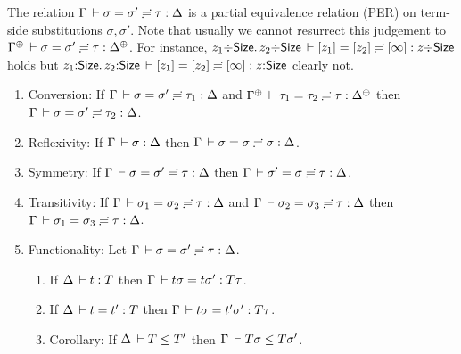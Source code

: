 \documentclass[acmsmall%
]{acmart}\settopmatter{printfolios=true}
\newcommand{\LONGVERSION}[1]{}
\begin{document}
The relation $\Gamma \,\vdash \sigma = \sigma' \risingdotseq \tau : \Delta$ is a partial equivalence
relation (PER) on term-side substitutions $\sigma,\sigma'$. Note that
usually we cannot resurrect this judgement to
$\sueq{\resurrect\Gamma}{\sigma}{\sigma'}\tau {\resurrect\Delta}$.
For instance,
$z_1 {\div} \mathsf{Size}.\,z_2 {\div} \mathsf{Size} \,\vdash [z_1] = [z_2] \risingdotseq [\infty] : z {\div} \mathsf{Size}$
holds but
$z_1 {:} \mathsf{Size}.\,z_2 {:} \mathsf{Size} \,\vdash [z_1] = [z_2] \risingdotseq [\infty] : z {:} \mathsf{Size}$
clearly not.
\begin{lemma}
\label{lem:subeq}\bla
\begin{enumerate}
\item Conversion: If\/ $\Gamma \,\vdash \sigma = \sigma' \risingdotseq \tau_1 : \Delta$ and $\sueq {\resurrect\Gamma} {\tau_1} {\tau_2} {\tau} {\resurrect\Delta}$ then $\Gamma \,\vdash \sigma = \sigma' \risingdotseq \tau_2 : \Delta$.
\item Reflexivity: If\/ $\Gamma \,\vdash \sigma : \Delta$ then $\Gamma \,\vdash \sigma = \sigma \risingdotseq \sigma : \Delta$.
\item Symmetry:  If\/ $\sueq \Gamma \sigma {\sigma'} {\tau} \Delta$ then $\Gamma \,\vdash \sigma' = \sigma \risingdotseq \tau : \Delta$.
\item Transitivity:  If\/ $\Gamma \,\vdash \sigma_1 = \sigma_2 \risingdotseq \tau : \Delta$ and $\Gamma \,\vdash \sigma_2 = \sigma_3 \risingdotseq \tau : \Delta$ then $\Gamma \,\vdash \sigma_1 = \sigma_3 \risingdotseq \tau : \Delta$.
\item Functionality: Let $\Gamma \,\vdash \sigma = \sigma' \risingdotseq \tau : \Delta$.
  \begin{enumerate}
  \item
  If\/ $\Delta \,\vdash t : T$ then $\Gamma \,\vdash t\sigma = t\sigma' : T\tau$.
  \item
  If\/ $\Delta \,\vdash t = t' : T$ then $\Gamma \,\vdash t\sigma = t'\sigma' : T\tau$.
  \item
  Corollary: If\/ $\Delta \,\vdash T \leq T'$ then $\Gamma \,\vdash T\sigma \leq T\sigma'$.
  \end{enumerate}
\end{enumerate}
\end{lemma}

\LONGVERSION{
\begin{corollary}[Partial resurrection for substitution equality]
  If\/ $\sueq \Gamma \sigma {\sigma'} {\tau} \Delta$ then
  $\sueq {\resurrect \Gamma} \tau \tau \tau {\resurrect \Delta}$.
\end{corollary}
}
\end{document}
